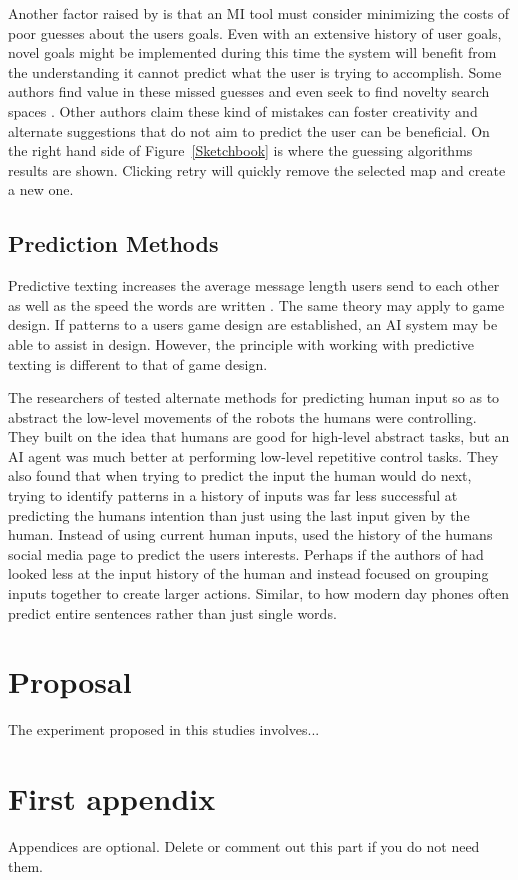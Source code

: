 \documentclass[journal]{IEEEtran}
\begin{document}
Another factor raised by \cite{horvitz1999principles} is that an MI tool must consider minimizing the costs of poor guesses about the users goals. Even with an extensive history of user goals, novel goals might be implemented during this time the system will benefit from the understanding it cannot predict what the user is trying to accomplish.  Some authors find value in these missed guesses and even seek to find novelty search spaces \cite{liapis2013sentient}. Other authors \cite{liapis2016can,alvarez2018fostering, yannakakis2014mixed} claim these kind of mistakes can foster creativity and alternate suggestions that do not aim to predict the user can be beneficial. On the right hand side of Figure~\ref{Sketchbook} is where the guessing algorithms results are shown. Clicking retry will quickly remove the selected map and create a new one. 


\subsection{Prediction Methods} \label{prediction}
Predictive texting increases the average message length users send to each other \cite{ling2005length} as well as the speed the words are written \cite{dunlop2000predictive}. The same theory may apply to game design. If patterns to a users game design are established, an AI system may be able to assist in design. However, the principle with working with predictive texting is different to that of game design.

The researchers of \cite{chipalkatty2013less} tested alternate methods for predicting human input so as to abstract the low-level movements of the robots the humans were controlling. They built on the idea that humans are good for high-level abstract tasks, but an AI agent was much better at performing low-level repetitive control tasks. They also found that when trying to predict the input the human would do next, trying to identify patterns in a history of inputs was far less successful at predicting the humans intention than just using the last input given by the human. Instead of using current human inputs, \cite{bhatia2016targeted} used the history of the humans social media page to predict the users interests. Perhaps if the authors of \cite{chipalkatty2013less} had looked less at the input history of the human and instead focused on grouping inputs together to create larger actions. Similar, to how modern day phones often predict entire sentences rather than just single words.



\section{Proposal}
The experiment proposed in this studies involves...





\appendices
\section{First appendix}
Appendices are optional. Delete or comment out this part if you do not need them.

\end{document}
